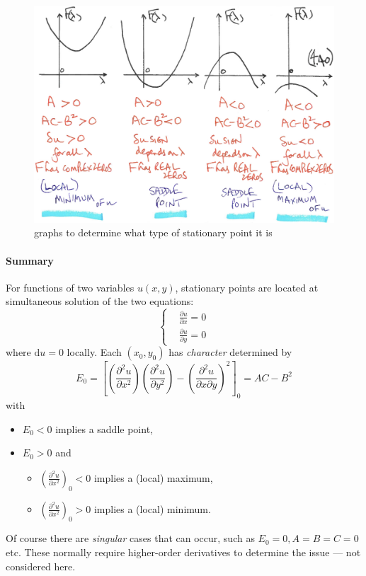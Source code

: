 \documentclass[12pt]{report}
\theoremstyle{definition}
\begin{document}
\begin{figure}
  	\includegraphics[scale=0.15]{stationaryPointDet.jpeg}
  	\centering
    \caption{graphs to determine what type of stationary point it is}\label{fig:stationaryPointDet}
\end{figure}

\paragraph{Summary}

For functions of two variables $u(x,y)$, stationary points are located at simultaneous solution
of the two equations:\[
    \left\{\begin{align*}
        & \frac{\partial u}{\partial x} = 0 \\
        & \frac{\partial u}{\partial y} = 0
    \end{align*}\right.
\]where $\mathrm{d}u = 0$ locally.
Each $(x_0, y_0)$ has \emph{character} determined by\[
    E_0 = {\left[\left(\frac{\partial^{2}u}{\partial x^{2}} \right)
    \left(\frac{\partial^{2}u}{\partial y^{2}} \right)
    - {\left(\frac{\partial^{2}u}{\partial x\partial y} \right)}^{2}\right]}_{0} = AC-B^{2}
\]with
\begin{itemize}
    \item $E_0 < 0$ implies a saddle point,
    \item $E_0 > 0$ and
        \begin{itemize}
            \item ${\left(\frac{\partial^{2}u}{\partial x^{2}} \right)}_{0} < 0$ implies a (local) maximum,
            \item ${\left(\frac{\partial^{2}u}{\partial x^{2}} \right)}_{0} > 0$ implies a (local) minimum.
        \end{itemize}
\end{itemize}
Of course there are \emph{singular} cases that can occur, such as
$E_0 = 0, A = B = C = 0$ etc.
These normally require higher-order derivatives to determine the issue --- not considered here.
\end{document}
